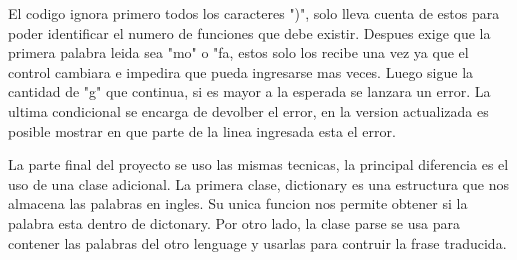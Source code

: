 \documentclass[conference]{IEEEtran}
\begin{document}
El codigo ignora primero todos los caracteres ")", solo lleva cuenta de estos para poder identificar el numero de funciones que debe existir. Despues exige que la primera palabra leida sea "mo" o "fa, estos solo los recibe una vez ya que el control cambiara e impedira que pueda ingresarse mas veces. Luego sigue la cantidad de "g" que continua, si es mayor a la esperada se lanzara un error. La ultima condicional se encarga de devolber el error, en la version actualizada es posible mostrar en que parte de la linea ingresada esta el error. 

La parte final del proyecto se uso las mismas tecnicas, la principal diferencia es el uso de una clase adicional. La primera clase, dictionary es una estructura que nos almacena las palabras en ingles. Su unica funcion nos permite obtener si la palabra esta dentro de dictonary. Por otro lado, la clase parse se usa para contener las palabras del otro lenguage y usarlas para contruir la frase traducida.
\end{document}
